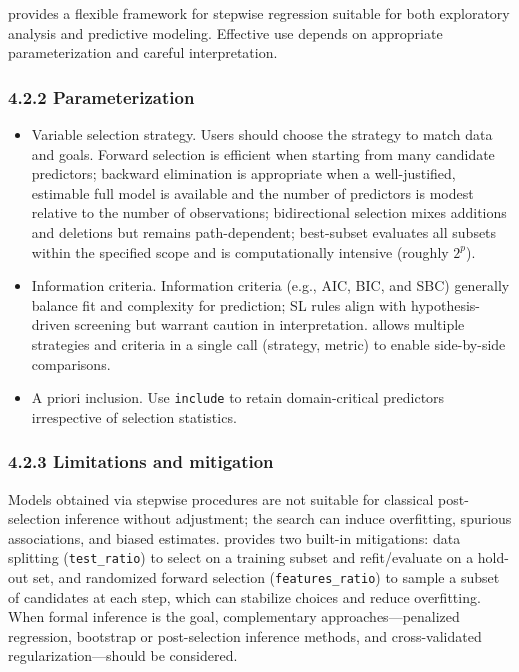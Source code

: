  provides a flexible framework for stepwise regression suitable for both exploratory analysis and predictive modeling. Effective use depends on appropriate parameterization and careful interpretation.

\subsubsection{4.2.2 Parameterization}\label{parameterization}

\begin{itemize}
\item
  Variable selection strategy. Users should choose the strategy to match data and goals. Forward selection is efficient when starting from many candidate predictors; backward elimination is appropriate when a well-justified, estimable full model is available and the number of predictors is modest relative to the number of observations; bidirectional selection mixes additions and deletions but remains path-dependent; best-subset evaluates all subsets within the specified scope and is computationally intensive (roughly \(2^p\)).
\item
  Information criteria. Information criteria (e.g., AIC, BIC, and SBC) generally balance fit and complexity for prediction; SL rules align with hypothesis-driven screening but warrant caution in interpretation.  allows multiple strategies and criteria in a single call (strategy, metric) to enable side-by-side comparisons.
\item
  A priori inclusion. Use \texttt{include} to retain domain-critical predictors irrespective of selection statistics.
\end{itemize}

\subsubsection{4.2.3 Limitations and mitigation}\label{limitations-and-mitigation}

Models obtained via stepwise procedures are not suitable for classical post-selection inference without adjustment; the search can induce overfitting, spurious associations, and biased estimates.  provides two built-in mitigations: data splitting (\texttt{test\_ratio}) to select on a training subset and refit/evaluate on a hold-out set, and randomized forward selection (\texttt{features\_ratio}) to sample a subset of candidates at each step, which can stabilize choices and reduce overfitting. When formal inference is the goal, complementary approaches---penalized regression, bootstrap or post-selection inference methods, and cross-validated regularization---should be considered.


